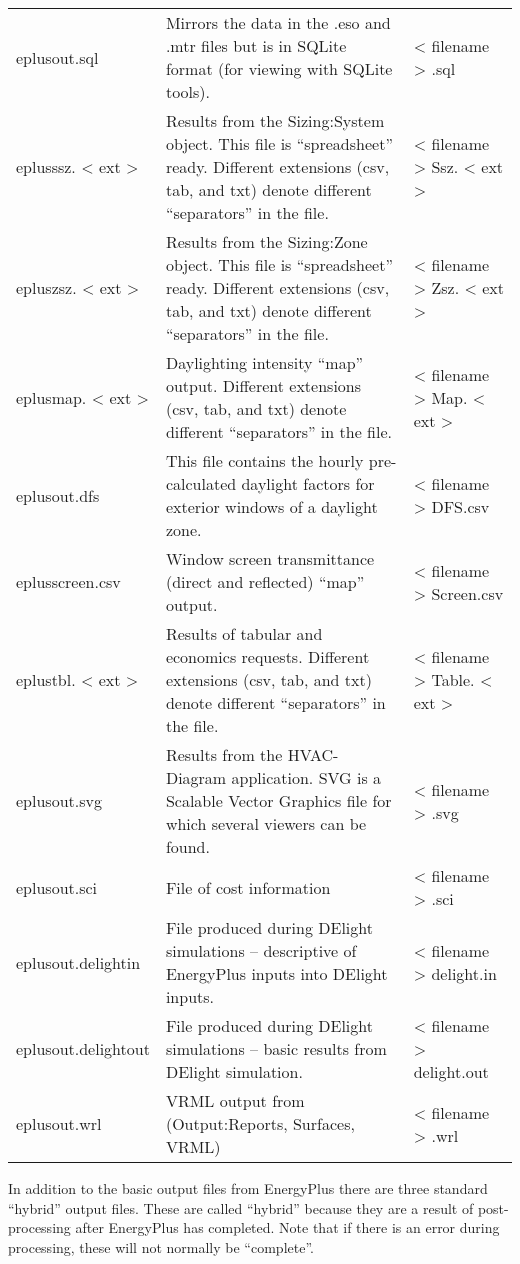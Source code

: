 \begin{longtable}[c]{p{1.5in}p{3.0in}p{1.5in}}
eplusout.sql & Mirrors the data in the .eso and .mtr files but is in SQLite format (for viewing with SQLite tools). & < filename > .sql \tabularnewline
eplusssz. < ext > & Results from the Sizing:System object. This file is “spreadsheet” ready. Different extensions (csv, tab, and txt) denote different “separators” in the file. & < filename > Ssz. < ext > \tabularnewline
epluszsz. < ext > & Results from the Sizing:Zone object. This file is “spreadsheet” ready. Different extensions (csv, tab, and txt) denote different “separators” in the file. & < filename > Zsz. < ext > \tabularnewline
eplusmap. < ext > & Daylighting intensity “map” output. Different extensions (csv, tab, and txt) denote different “separators” in the file. & < filename > Map. < ext > \tabularnewline
eplusout.dfs & This file contains the hourly pre-calculated daylight factors for exterior windows of a daylight zone. & < filename > DFS.csv \tabularnewline
eplusscreen.csv & Window screen transmittance (direct and reflected) “map” output. & < filename > Screen.csv \tabularnewline
eplustbl. < ext > & Results of tabular and economics requests. Different extensions (csv, tab, and txt) denote different “separators” in the file. & < filename > Table. < ext > \tabularnewline
eplusout.svg & Results from the HVAC-Diagram application. SVG is a Scalable Vector Graphics file for which several viewers can be found. & < filename > .svg \tabularnewline
eplusout.sci & File of cost information & < filename > .sci \tabularnewline
eplusout.delightin & File produced during DElight simulations – descriptive of EnergyPlus inputs into DElight inputs. & < filename > delight.in \tabularnewline
eplusout.delightout & File produced during DElight simulations – basic results from DElight simulation. & < filename > delight.out \tabularnewline
eplusout.wrl & VRML output from (Output:Reports, Surfaces, VRML) & < filename > .wrl \tabularnewline
\bottomrule
\end{longtable}

In addition to the basic output files from EnergyPlus there are three standard ``hybrid'' output files. These are called ``hybrid'' because they are a result of post-processing after EnergyPlus has completed. Note that if there is an error during processing, these will not normally be ``complete''.

